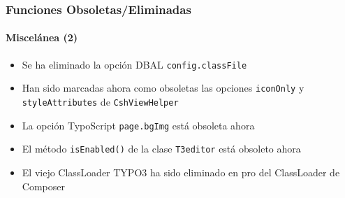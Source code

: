 \begin{frame}[fragile]
	\frametitle{Funciones Obsoletas/Eliminadas}
	\framesubtitle{Miscelánea (2)}

	\begin{itemize}

		\item Se ha eliminado la opción DBAL \texttt{config.classFile}

		\item Han sido marcadas ahora como obsoletas las opciones \texttt{iconOnly} y \texttt{styleAttributes} de
			\texttt{CshViewHelper}

		\item La opción TypoScript \texttt{page.bgImg} está obsoleta ahora

		\item El método \texttt{isEnabled()} de la clase \texttt{T3editor} está obsoleto ahora

		\item El viejo ClassLoader TYPO3 ha sido eliminado en pro del ClassLoader de Composer

	\end{itemize}

\end{frame}

